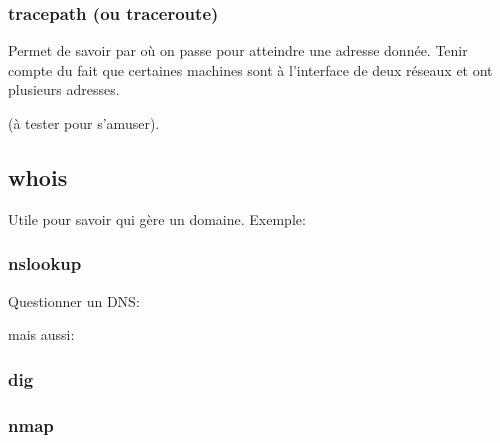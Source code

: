 \subsubsection{tracepath (ou traceroute)} Permet de savoir par où on
passe pour atteindre une adresse donnée. Tenir compte du fait que
certaines machines sont à l'interface de deux réseaux et ont plusieurs
adresses.


(à tester pour s'amuser).

\subsection{whois}
Utile pour savoir qui gère un domaine. Exemple:


\subsubsection{nslookup}
Questionner un DNS:



mais aussi:


\subsubsection{dig}

\subsubsection{nmap}
